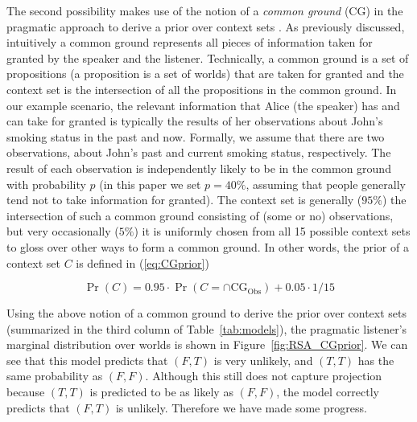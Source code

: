 
The second possibility makes use of the notion of a \emph{common ground} (CG) 
 in the pragmatic approach to derive a prior over context sets
 \cite{Stalnaker1974:Pragmatic-Presuppositions}.
As previously discussed, intuitively a common ground represents all pieces of
 information taken for granted by the speaker and the listener.
Technically, a common ground is a set of propositions (a proposition is a set of
  worlds) that are taken for granted and the context set is the intersection of all the propositions in the common ground.
In our example scenario, the relevant information that Alice (the speaker) has 
 and can take for granted is typically the results of her observations about John's smoking status in the past and now.
Formally, we assume that there are two observations, about John's past and current
 smoking status, respectively. 
The result of each observation is independently likely to be in the common ground
 with probability $p$ (in this paper we set $p=40\%$, assuming that people 
 generally tend not to take information for granted).
The context set is generally ($95\%$) the intersection of such a common ground
 consisting of (some or no) observations,
 but very occasionally ($5\%$) it is uniformly chosen from all 15 possible context 
 sets to gloss over other ways to form a common ground.
In other words, the prior of a context set $C$ is defined in (\ref{eq:CGprior})

\begin{equation}
\Pr(C)=0.95\cdot\Pr(C=\cap\text{CG}_\text{Obs})+0.05\cdot 1/15 \label{eq:CGprior}
\end{equation}


Using the above notion of a common ground to derive the prior over context sets
 (summarized in the third column of Table~\ref{tab:models}), the pragmatic
 listener's marginal distribution over worlds is shown in Figure~\ref{fig:RSA_CGprior}.
We can see that this model predicts that $(F, T)$ is very unlikely,
 and $(T, T)$ has the same probability as $(F, F)$. 
Although this still does not capture projection because $(T, T)$ is predicted to be
 as likely as $(F, F)$, the model correctly predicts that $(F, T)$ is unlikely. 
Therefore we have made some progress.

